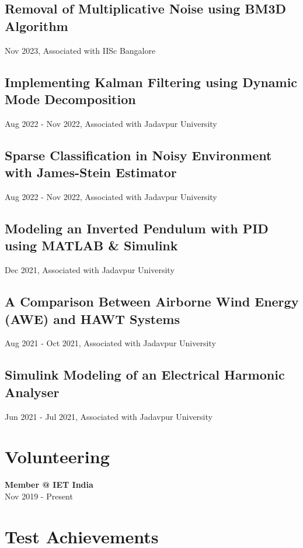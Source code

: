 \documentclass[a4paper,10pt]{article}
\begin{document}
\subsection*{Removal of Multiplicative Noise using BM3D Algorithm}
Nov 2023, Associated with IISc Bangalore
\href{https://www.slideshare.net/slideshows/bm3d-based-multiplicative-noise-removalpptx/266808339}{\faSlideshare}

\subsection*{Implementing Kalman Filtering using Dynamic Mode Decomposition}
Aug 2022 - Nov 2022, Associated with Jadavpur University 
  \href{https://www.slideshare.net/DebrajBanerjee22/extended-kalman-filtering-using-dmdpptx}{\faSlideshare}


\subsection*{Sparse Classification in Noisy Environment with James-Stein Estimator}
Aug 2022 - Nov 2022, Associated with Jadavpur University

\subsection*{Modeling an Inverted Pendulum with PID using MATLAB \& Simulink}
Dec 2021, Associated with Jadavpur University

\subsection*{A Comparison Between Airborne Wind Energy (AWE) and HAWT Systems}
Aug 2021 - Oct 2021, Associated with Jadavpur University

\subsection*{Simulink Modeling of an Electrical Harmonic Analyser}
Jun 2021 - Jul 2021, Associated with Jadavpur University

\section*{Volunteering}
\textbf{Member @ IET India} \\
Nov 2019 - Present

\section*{Test Achievements}
\end{document}
